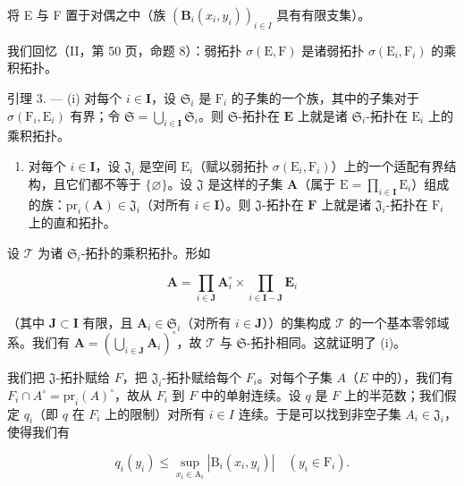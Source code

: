 将 E 与 F 置于对偶之中（族 \((\mathbf{B}_i(x_i, y_i))_{i \in I}\) 具有有限支集）。

我们回忆（II，第 50 页，命题 8）：弱拓扑 \(\sigma(\mathrm{E},\mathrm{F})\) 是诸弱拓扑 \(\sigma(\mathrm{E}_i,\mathrm{F}_i)\) 的乘积拓扑。

引理 3. --- (i) 对每个 \(i \in \mathbf{I}\)，设 \(\mathfrak{S}_i\) 是 \(\mathrm{F}_i\) 的子集的一个族，其中的子集对于 \(\sigma(\mathrm{F}_i, \mathrm{E}_i)\) 有界；令 \(\mathfrak{S} = \bigcup_{i \in \mathbf{I}} \mathfrak{S}_i\)。则 \(\mathfrak{S}\)-拓扑在 \(\mathbf{E}\) 上就是诸 \(\mathfrak{S}_i\)-拓扑在 \(\mathrm{E}_i\) 上的乘积拓扑。

\begin{enumerate}
\def\labelenumi{(\roman{enumi})}
\setcounter{enumi}{1}
\tightlist
\item
  对每个 \(i \in \mathbf{I}\)，设 \(\mathfrak{J}_i\) 是空间 \(\mathrm{E}_i\)（赋以弱拓扑 \(\sigma(\mathrm{E}_i, \mathrm{F}_i)\)）上的一个适配有界结构，且它们都不等于 \(\{\varnothing\}\)。设 \(\mathfrak{J}\) 是这样的子集 \(\mathbf{A}\)（属于 \(\mathrm{E} = \prod_{i \in \mathbf{I}} \mathrm{E}_i\)）组成的族：\(\mathrm{pr}_i(\mathbf{A}) \in \mathfrak{J}_i\)（对所有 \(i \in \mathbf{I}\)）。则 \(\mathfrak{J}\)-拓扑在 \(\mathbf{F}\) 上就是诸 \(\mathfrak{J}_i\)-拓扑在 \(\mathrm{F}_i\) 上的直和拓扑。
\end{enumerate}

设 \(\mathcal{T}\) 为诸 \(\mathfrak{S}_i\)-拓扑的乘积拓扑。形如

\[
\mathbf {A} = \prod_ {i \in \mathbf {J}} \mathbf {A} _ {i} ^ {\circ} \times \prod_ {i \in \mathbf {I} - \mathbf {J}} \mathbf {E} _ {i}
\]

（其中 \(\mathbf{J} \subset \mathbf{I}\) 有限，且 \(\mathbf{A}_i \in \mathfrak{S}_i\)（对所有 \(i \in \mathbf{J}\)））的集构成 \(\mathcal{T}\) 的一个基本零邻域系。我们有 \(\mathbf{A} = (\bigcup_{i \in \mathbf{J}} \mathbf{A}_i)^\circ\)，故 \(\mathcal{T}\) 与 \(\mathfrak{S}\)-拓扑相同。这就证明了 (i)。

我们把 \(\mathfrak{J}\)-拓扑赋给 \(F\)，把 \(\mathfrak{J}_i\)-拓扑赋给每个 \(F_i\)。对每个子集 \(A\)（\(E\) 中的），我们有 \(F_i \cap A^\circ = \text{pr}_i(A)^\circ\)，故从 \(F_i\) 到 \(F\) 中的单射连续。设 \(q\) 是 \(F\) 上的半范数；我们假定 \(q_i\)（即 \(q\) 在 \(F_i\) 上的限制）对所有 \(i \in I\) 连续。于是可以找到非空子集 \(A_i \in \mathfrak{J}_i\)，使得我们有

\[
q _ {i} \left(y _ {i}\right) \leqslant \sup _ {x _ {i} \in \mathrm{A} _ {i}} \left| \mathrm{B} _ {i} \left(x _ {i}, y _ {i}\right) \right| \quad \left(y _ {i} \in \mathrm{F} _ {i}\right).\tag{9}
\]


